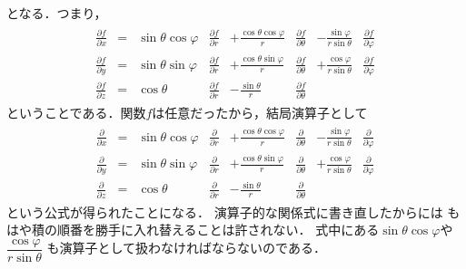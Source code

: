 となる．つまり，
\begin{align}
\begin{aligned}
\frac{ \partial f}{\partial x} & = & \sin \theta \cos \varphi & \frac{ \partial f}{\partial r}
& + \frac{ \cos \theta \cos \varphi }{r} & \frac{ \partial f}{\partial \theta} 
& - \frac{ \sin \varphi }{ r \sin \theta } &  \frac{ \partial f}{\partial \varphi} \\
\frac{ \partial f}{\partial y} & = & \sin \theta \sin \varphi & \frac{ \partial f}{\partial r}
& + \frac{ \cos \theta \sin \varphi }{r} &  \frac{ \partial f}{\partial \theta} 
& + \frac{ \cos \varphi }{ r \sin \theta } & \frac{ \partial f}{\partial \varphi} \\
\frac{ \partial f}{\partial z} & = & \cos \theta & \frac{ \partial f}{\partial r} 
& - \frac{ \sin \theta }{r} & \frac{ \partial f}{\partial \theta}
\end{aligned}
\label{eq:kyokuDesbibunhenkan}
\end{align}
ということである．関数$f$は任意だったから，結局演算子として
\begin{align}
\begin{aligned}
\frac{ \partial }{\partial x} & = & \sin \theta \cos \varphi & \frac{ \partial }{\partial r}
& + \frac{ \cos \theta \cos \varphi }{r} & \frac{ \partial }{\partial \theta} 
& - \frac{ \sin \varphi }{ r \sin \theta } &  \frac{ \partial }{\partial \varphi} \\
\frac{ \partial }{\partial y} & = & \sin \theta \sin \varphi & \frac{ \partial }{\partial r}
& + \frac{ \cos \theta \sin \varphi }{r} &  \frac{ \partial }{\partial \theta} 
& + \frac{ \cos \varphi }{ r \sin \theta } & \frac{ \partial }{\partial \varphi} \\
\frac{ \partial }{\partial z} & = & \cos \theta & \frac{ \partial }{\partial r} 
& - \frac{ \sin \theta }{r} & \frac{ \partial }{\partial \theta}
\end{aligned}
\label{eq:kyokuDesopehenkan}
\end{align}
という公式が得られたことになる．
演算子的な関係式に書き直したからには
もはや積の順番を勝手に入れ替えることは許されない．
式中にある$\sin \theta \cos \varphi$や$\dfrac{ \cos \varphi}{r \sin \theta}$
も演算子として扱わなければならないのである．

